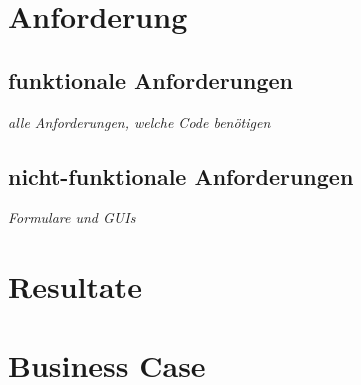 \section{Anforderung}
\subsection{funktionale Anforderungen}
\textit{alle Anforderungen, welche Code benötigen}
\subsection{nicht-funktionale Anforderungen}
\textit{Formulare und GUIs}

\section{Resultate}
\section{Business Case}